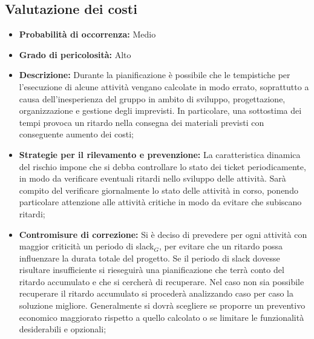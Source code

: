 \subsection{Valutazione dei costi}
\begin{itemize}
\item \textbf{Probabilità di occorrenza:} Medio
\item \textbf{Grado di pericolosità:} Alto
\item \textbf{Descrizione:} Durante la pianificazione è possibile che le tempistiche per l'esecuzione di alcune attività vengano calcolate in modo errato, soprattutto a causa dell'inesperienza del gruppo in ambito di sviluppo, progettazione, organizzazione e gestione degli imprevisti. In particolare, una sottostima dei tempi provoca un ritardo nella consegna dei materiali previsti con conseguente aumento dei costi;

\item \textbf{Strategie per il rilevamento e prevenzione:} La caratteristica dinamica del rischio impone che si debba controllare lo stato dei ticket periodicamente, in modo da verificare eventuali ritardi nello sviluppo delle attività. Sarà compito del \ruoloResponsabile verificare giornalmente lo stato delle attività in corso, ponendo particolare attenzione alle attività critiche in modo da evitare che subiscano ritardi;


\item \textbf{Contromisure di correzione:} Si è deciso di prevedere per ogni attività con maggior criticità un periodo di slack$_G$, per evitare che un ritardo possa influenzare la durata totale del progetto. Se il periodo di slack dovesse risultare insufficiente si rieseguirà una pianificazione che terrà conto del ritardo accumulato e che si cercherà di recuperare. Nel caso non sia possibile recuperare il ritardo accumulato si procederà analizzando caso per caso la soluzione migliore. Generalmente si dovrà scegliere se proporre un preventivo economico maggiorato rispetto a quello calcolato o se limitare le funzionalità desiderabili e opzionali;

\end{itemize}

